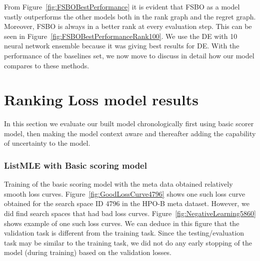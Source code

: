 \documentclass[12pt, twoside, ngerman]{report}
\begin{document}
From Figure~\ref{fig:FSBOBestPerformance} it is evident that FSBO as a model vastly outperforms the other models both in the rank graph and the regret graph.
Moreover,  FSBO is always in a better rank at every evaluation step.
This can be seen in Figure~\ref{fig:FSBOBestPerformanceRank100}.
We use the DE with 10 neural network ensemble because it was giving best results for DE.
With the performance of the baselines set,  we now move to discuss in detail how our model compares to these methods.


\section{Ranking Loss model results}

In this section we evaluate our built model chronologically first using basic scorer model,  then making the model context aware and thereafter adding the capability of uncertainty to the model.

\subsubsection{ListMLE with Basic scoring model}
Training of the basic scoring model with the meta data obtained relatively smooth loss curves.
Figure~\ref{fig:GoodLossCurve4796} shows one such loss curve obtained for the search space ID 4796 in the HPO-B meta dataset.
However,  we did find search spaces that had bad loss curves.
Figure~\ref{fig:NegativeLearning5860} shows example of one such loss curves.
We can deduce in this figure that the validation task is different from the training task.
Since the testing/evaluation task may be similar to the training task,  we did not do any early stopping of the model (during training) based on the validation losses.
\end{document}
